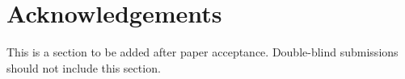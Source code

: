 \section*{Acknowledgements}\label{sec:acknowledgements}

This is a section to be added after paper acceptance.
Double-blind submissions
should not include this section.

\begin{comment}
    This research is supported
    by National Natural Science Foundation of China
    (\numero{62376263}),
    and Basic Research Program of Shenzhen
    (\numero{JCYJ20230807140507015}).
\end{comment}
